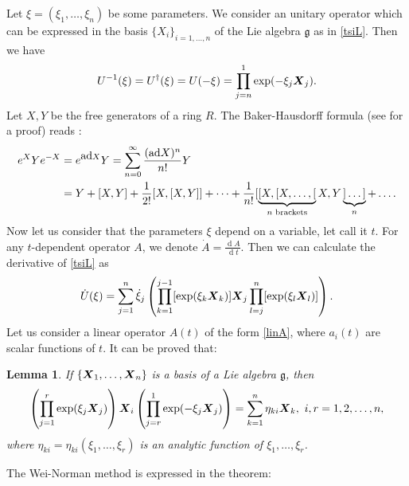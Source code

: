 \documentclass[12pt]{amsart}
\numberwithin{equation}{section}
\newtheorem{lemma}{Lemma}
\theoremstyle{definition}
\begin{document}
Let $\xi=(\xi_1,\dots,\xi_n)$ be  some parameters. We consider an unitary
operator which can be expressed in the basis $\{X_i\}_{i=1,\dots,n}$
of the Lie algebra ${{\mathfrak{{g}}}}$ as in \eqref{tsiL}. 
Then we have
\begin{equation}\label{tximin}
U^{-1}(\xi)=U^{\dagger}(\xi)=U(-\xi)=\prod_{j=n}^1\exp(-\xi_j{{\mbox{\boldmath{${X}$}}}}_j).
\end{equation}
Let $X,Y$ be the free generators of a ring $R$. The Baker-Hausdorff
formula (see  \cite{mag} for a proof)  reads :
\begin{equation}\label{BCH}\begin{split}
e^XYe^{-X}&=e^{{{\mbox{\rm ad}}} X}Y=\sum_{n=0}^{\infty}\frac{({{\mbox{\rm ad}}} X)^n}{n!}Y\\
~~~&=Y+[X,Y]+\frac{1}{2!}[X,[X,Y]]+\dots
+\frac{1}{n!}[\underbrace{[X,[X,\dots,[}_{n\text{~brackets}}X,Y\underbrace{]\dots]}_{n}+\dots  .
\end{split}
\end{equation}
Now let us consider that the parameters $\xi$ depend on a variable,
let call it $t$. For any $t$-dependent operator $A$, we  denote
$\dot{A}=\frac{{\operatorname{d}} A}{{\operatorname{d}} t}$. Then we can calculate the derivative of \eqref{tsiL} as
\begin{equation}\label{dotT}
\dot{U}(\xi)=\sum_{j=1}^n \dot{\xi}_j\left(\prod_{k=1}^{j-1}[\exp(\xi_k{{\mbox{\boldmath{${X}$}}}}_k)]{{\mbox{\boldmath{${X}$}}}}_j\prod_{l=j}^n[\exp(\xi_l{{\mbox{\boldmath{${X}$}}}}_l)]\right).
\end{equation}
Let us consider a linear operator $A(t)$ of the form \eqref{linA}, 
where $a_i(t)$ are scalar functions of $t$.
It can be   proved  \cite{wei} that:
\begin{lemma}If $\{{{\mbox{\boldmath{${X}$}}}}_1,\dots,{{\mbox{\boldmath{${X}$}}}}_n \}$ is  a basis of a Lie algebra
  ${{\mathfrak{{g}}}}$, then
\begin{equation}\label{lemW}
\left(\prod_{j=1}^r\exp(\xi_j{{\mbox{\boldmath{${X}$}}}}_j)\right){{\mbox{\boldmath{${X}$}}}}_i\left(\prod_{j=r}^1\exp(-\xi_j{{\mbox{\boldmath{${X}$}}}}_j)\right)=\sum_{k=1}^n\eta_{ki}{{\mbox{\boldmath{${X}$}}}}_k,~i,
r=1,2,\dots,n,
\end{equation}
where $\eta_{ki}=\eta_{ki}(\xi_1,\dots,\xi_r)$ is an analytic
function of $\xi_1,\dots,\xi_r$. 
\end{lemma}
The Wei-Norman method  \cite{wei} is expressed in the theorem:
\end{document}
